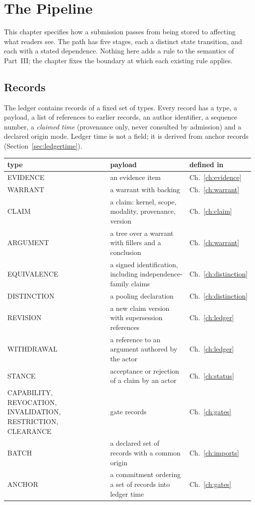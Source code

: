 \chapter{The Pipeline}\label{ch:pipeline}

This chapter specifies how a submission passes from being stored to affecting what readers see. The path has five stages, each a distinct state transition, and each with a stated dependence. Nothing here adds a rule to the semantics of Part~III; the chapter fixes the boundary at which each existing rule applies.

\section{Records}\label{sec:recordtypes}

The ledger contains records of a fixed set of types. Every record has a type, a payload, a list of references to earlier records, an author identifier, a sequence number, a \emph{claimed time} (provenance only, never consulted by admission) and a declared origin mode. Ledger time is not a field; it is derived from anchor records (Section~\ref{sec:ledgertime}).

\begin{center}
\small
\begin{tabularx}{\textwidth}{@{}>{\raggedright\arraybackslash}p{} X l@{}}
\toprule
type & payload & defined in\\
\midrule
\textsf{EVIDENCE} & an evidence item & Ch.~\ref{ch:evidence}\\
\textsf{WARRANT} & a warrant with backing & Ch.~\ref{ch:warrant}\\
\textsf{CLAIM} & a claim: kernel, scope, modality, provenance, version & Ch.~\ref{ch:claim}\\
\textsf{ARGUMENT} & a tree over a warrant with fillers and a conclusion & Ch.~\ref{ch:warrant}\\
\textsf{EQUIVALENCE} & a signed identification, including independence-family claims & Ch.~\ref{ch:distinction}\\
\textsf{DISTINCTION} & a pooling declaration & Ch.~\ref{ch:distinction}\\
\textsf{REVISION} & a new claim version with supersession references & Ch.~\ref{ch:ledger}\\
\textsf{WITHDRAWAL} & a reference to an argument authored by the actor & Ch.~\ref{ch:ledger}\\
\textsf{STANCE} & acceptance or rejection of a claim by an actor & Ch.~\ref{ch:status}\\
\textsf{CAPABILITY}, \textsf{REVOCATION}, \textsf{INVALIDATION}, \textsf{RESTRICTION}, \textsf{CLEARANCE} & gate records & Ch.~\ref{ch:gates}\\
\textsf{BATCH} & a declared set of records with a common origin & Ch.~\ref{ch:imports}\\
\textsf{ANCHOR} & a commitment ordering a set of records into ledger time & Ch.~\ref{ch:gates}\\
\bottomrule
\end{tabularx}
\end{center}

